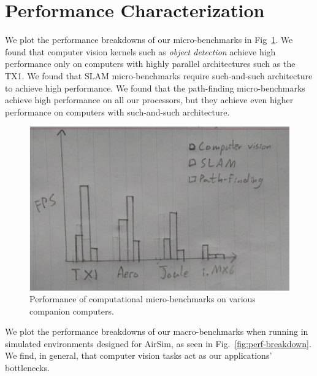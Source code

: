 \section{Performance Characterization}


We plot the performance breakdowns of our micro-benchmarks in Fig~\ref{fig:micro-perf}. We found that computer vision kernels such as \textit{object detection} achieve high performance only on computers with highly parallel  architectures such as the TX1. We found that SLAM micro-benchmarks require such-and-such architecture to achieve high performance. We found that the path-finding micro-benchmarks achieve high performance on all our processors, but they achieve even higher performance on computers with such-and-such architecture.

\begin{figure}[h]
\centering
\includegraphics[width=\linewidth]{figs/micro-perf}
\caption{Performance of computational micro-benchmarks on various companion computers.}
\label{fig:micro-perf}
\end{figure}

We plot the performance breakdowns of our macro-benchmarks when running in simulated environments designed for AirSim, as seen in Fig.~\ref{fig:perf-breakdown}. We find, in general, that computer vision tasks act as our applications' bottlenecks.

